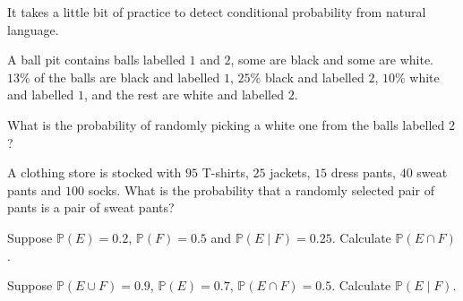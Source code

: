 \documentclass[../main.tex]{subfiles}
\begin{document}
It takes a little bit of practice to detect conditional probability from natural language.
\begin{example}
  A ball pit contains balls labelled \(1\) and \(2\), some are black and some are white.  \(13\%\) of the balls are black and labelled \(1\), \(25\%\) black and labelled \(2\), \(10\%\) white and labelled \(1\), and the rest are white and labelled \(2\).

  What is the probability of randomly picking a white one from the balls labelled \(2\)?
\end{example}

\begin{example}
  A clothing store is stocked with \(95\) T-shirts, \(25\) jackets, \(15\) dress pants, \(40\) sweat pants and \(100\) socks. What is the probability that a randomly selected pair of pants is a pair of sweat pants?
\end{example}

\begin{example}
  Suppose \(\mathbb{P}(E) = 0.2\), \(\mathbb{P}(F) = 0.5\) and \(\mathbb{P}(E \mid F) = 0.25\). Calculate \(\mathbb{P}(E \cap F)\).
\end{example}

\begin{example}
  Suppose \(\mathbb{P}(E \cup F) = 0.9\), \(\mathbb{P}(E) = 0.7\), \(\mathbb{P}(E \cap F) = 0.5\). Calculate \(\mathbb{P}(E \mid F)\).
\end{example}
\end{document}
